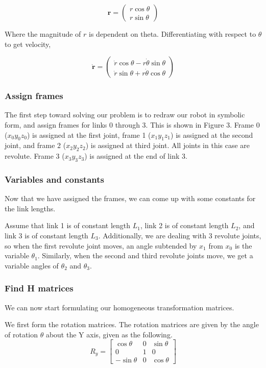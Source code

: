 \documentclass[conference]{IEEEtran}
\begin{document}
\[
    \textbf{r} =
    \begin{pmatrix}
        r \cos \theta\\
        r \sin \theta
    \end{pmatrix}
\]

Where the magnitude of $r$ is dependent on theta. Differentiating
with respect to $\theta$ to get velocity,

\[
    \dot{\textbf{r}} =
    \begin{pmatrix}
        \dot{r} \cos \theta - r \dot{\theta} \sin \theta\\
        \dot{r} \sin \theta + r \dot{\theta} \cos \theta
    \end{pmatrix}
\]

\subsubsection{Assign frames}
The first step toward solving our problem is to redraw our robot in symbolic
form, and assign frames for links 0 through 3. This is shown in
Figure 3. Frame 0 ($x_0 y_0 z_0$) is assigned at the first joint, frame 1
($x_1 y_1 z_1$) is assigned at the
second joint, and frame 2 ($x_2 y_2 z_2$)
 is assigned at third joint. All joints in this case are revolute.
 Frame 3 ($x_3 y_3 z_3$) is assigned at
the end of link 3.\\

\subsubsection{Variables and constants}
Now that we have assigned the frames, we can come up with some constants for
the link lengths. 

Assume that link 1 is of constant length $L_1$, link 2 is 
of constant length $L_2$, and link 3 is of constant length $L_3$. Additionally,
we are dealing with 3 revolute joints, so when the first revolute joint moves,
an angle subtended by $x_1$ from $x_0$ is the variable $\theta_1$. Similarly,
when the second and third revolute joints move, we get a variable angles of
$\theta_2$ and $\theta_3$.

\subsubsection{Find H matrices}
We can now start formulating our homogeneous transformation matrices.

We first form the rotation matrices. The rotation matrices are given by
the angle of rotation $\theta$ about the Y axis, given as the following.
\begin{equation*}
    R_y =
    \begin{bmatrix}
         \cos\theta  & 0 & \sin\theta\\
         0 & 1 & 0\\
         -\sin\theta & 0 & \cos\theta
    \end{bmatrix}
\end{equation*}
\end{document}
